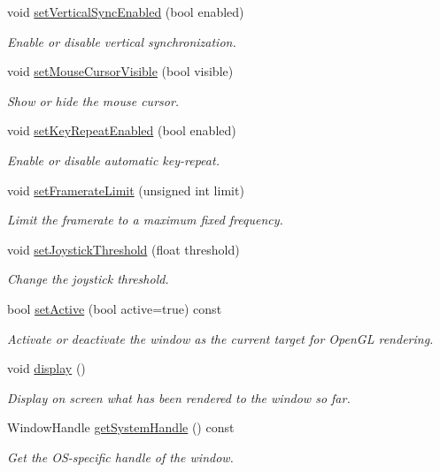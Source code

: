 \begin{DoxyCompactItemize}
void \hyperlink{classsf_1_1_window_a59041c4556e0351048f8aff366034f61}{set\+Vertical\+Sync\+Enabled} (bool enabled)
\begin{DoxyCompactList}\small\item\em Enable or disable vertical synchronization. \end{DoxyCompactList}\item 
void \hyperlink{classsf_1_1_window_aad3991c25e0a83afbb4d62febf9b7b14}{set\+Mouse\+Cursor\+Visible} (bool visible)
\begin{DoxyCompactList}\small\item\em Show or hide the mouse cursor. \end{DoxyCompactList}\item 
void \hyperlink{classsf_1_1_window_aef9f2b14c10ecba8a8df95dd51c5bb73}{set\+Key\+Repeat\+Enabled} (bool enabled)
\begin{DoxyCompactList}\small\item\em Enable or disable automatic key-\/repeat. \end{DoxyCompactList}\item 
void \hyperlink{classsf_1_1_window_af4322d315baf93405bf0d5087ad5e784}{set\+Framerate\+Limit} (unsigned int limit)
\begin{DoxyCompactList}\small\item\em Limit the framerate to a maximum fixed frequency. \end{DoxyCompactList}\item 
void \hyperlink{classsf_1_1_window_aa45b8f54e29a6f59f1fc7ee66b2fab68}{set\+Joystick\+Threshold} (float threshold)
\begin{DoxyCompactList}\small\item\em Change the joystick threshold. \end{DoxyCompactList}\item 
bool \hyperlink{classsf_1_1_window_a17ccf8ece0ce0bf2f1e6698bcfa29731}{set\+Active} (bool active=true) const 
\begin{DoxyCompactList}\small\item\em Activate or deactivate the window as the current target for Open\+G\+L rendering. \end{DoxyCompactList}\item 
void \hyperlink{classsf_1_1_window_adabf839cb103ac96cfc82f781638772a}{display} ()
\begin{DoxyCompactList}\small\item\em Display on screen what has been rendered to the window so far. \end{DoxyCompactList}\item 
Window\+Handle \hyperlink{classsf_1_1_window_a26368e7162229f8637c34d80ab0f138e}{get\+System\+Handle} () const 
\begin{DoxyCompactList}\small\item\em Get the O\+S-\/specific handle of the window. \end{DoxyCompactList}\end{DoxyCompactItemize}
